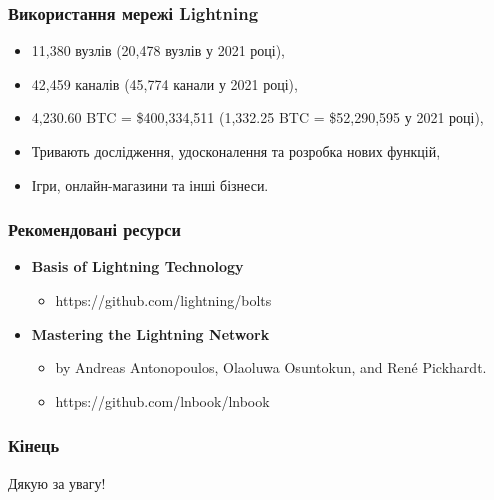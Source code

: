 \documentclass{beamer}
\begin{document}
\begin{frame}
  \frametitle{Використання мережі Lightning}
  \begin{itemize}
  \item 11,380 вузлів (20,478 вузлів у 2021 році),
  \item 42,459 каналів (45,774 канали у 2021 році),
  \item 4,230.60 BTC = \$400,334,511 (1,332.25 BTC = \$52,290,595 у 2021 році),
  \item Тривають дослідження, удосконалення та розробка нових функцій,
  \item Ігри, онлайн-магазини та інші бізнеси.
  \end{itemize}
\end{frame}

\begin{frame}
  \frametitle{Рекомендовані ресурси}
  \begin{itemize}
  \item \textbf{Basis of Lightning Technology}
    \begin{itemize}
    \item  https://github.com/lightning/bolts
    \end{itemize}
  \item \textbf{Mastering the Lightning Network}
    \begin{itemize}
    \item by Andreas Antonopoulos, Olaoluwa Osuntokun, and René Pickhardt.
    \item https://github.com/lnbook/lnbook
    \end{itemize}
  \end{itemize}
\end{frame}

\begin{frame}
  \frametitle{Кінець}
  \begin{center}
    Дякую за увагу!
  \end{center}
\end{frame}
\end{document}
